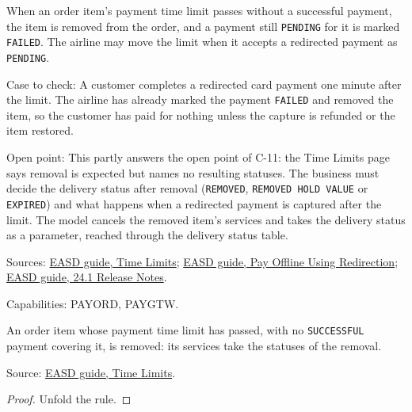 \begin{definition}
  \label{def:payment-time-limit-expiry}
  When an order item's payment time limit passes without a successful
  payment, the item is removed from the order, and a payment still
  \texttt{PENDING} for it is marked \texttt{FAILED}. The airline may move
  the limit when it accepts a redirected payment as \texttt{PENDING}.

  Case to check: A customer completes a redirected card payment one minute
  after the limit. The airline has already marked the payment
  \texttt{FAILED} and removed the item, so the customer has paid for nothing
  unless the capture is refunded or the item restored.

  Open point: This partly answers the open point of C-11: the Time Limits
  page says removal is expected but names no resulting statuses. The
  business must decide the delivery status after removal
  (\texttt{REMOVED}, \texttt{REMOVED HOLD VALUE} or \texttt{EXPIRED}) and
  what happens when a redirected payment is captured after the limit.  The
  model cancels the removed item's services and takes the delivery status as
  a parameter, reached through the delivery status table.

  Sources: \href{https://standards.atlassian.net/wiki/spaces/EASD/pages/574423066/Time+Limits}{EASD guide, Time Limits};
  \href{https://standards.atlassian.net/wiki/spaces/EASD/pages/574455927/Pay+Offline+Using+Redirection}{EASD guide, Pay Offline Using Redirection};
  \href{https://standards.atlassian.net/wiki/spaces/EASD/pages/1404665857}{EASD guide, 24.1 Release Notes}.

  Capabilities: PAYORD, PAYGTW.
\end{definition}

\begin{theorem}
  \label{thm:payment-expire-removes}
  An order item whose payment time limit has passed, with no
  \texttt{SUCCESSFUL} payment covering it, is removed: its services take the
  statuses of the removal.

  Source: \href{https://standards.atlassian.net/wiki/spaces/EASD/pages/574423066/Time+Limits}{EASD guide, Time Limits}.
\end{theorem}
\begin{proof}
  Unfold the rule.
\end{proof}

